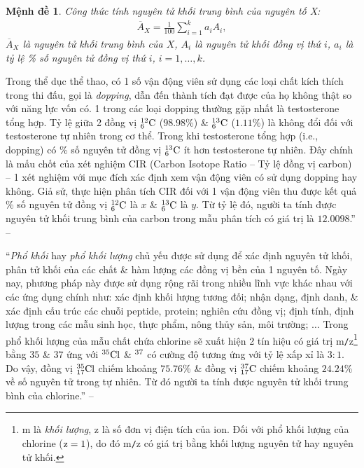 \documentclass{article}
\numberwithin{equation}{section}
\newtheorem{menhde}{Mệnh đề}[section]
\begin{document}
\begin{menhde}
	Công thức tính nguyên tử khối trung bình của nguyên tố X:
	\begin{align*}
		\overline{A}_X = \frac{1}{100}\sum_{i=1}^k a_iA_i,
	\end{align*}
	$\overline{A}_X$ là nguyên tử khối trung bình của $X$, $A_i$ là nguyên tử khối đồng vị thứ $i$, $a_i$ là tỷ lệ \% số nguyên tử đồng vị thứ $i$, $i = 1,\ldots,k$.
\end{menhde}
Trong thể dục thể thao, có 1 số vận động viên sử dụng các loại chất kích thích trong thi đấu, gọi là \textit{dopping}, dẫn đến thành tích đạt được của họ không thật so với năng lực vốn có. 1 trong các loại dopping thường gặp nhất là testosterone tổng hợp. Tỷ lệ giữa 2 đồng vị $\rm{}_6^{12}C$ ($98.98$\%) \& $\rm{}_6^{13}C$ ($1.11$\%) là không đổi đối với testosterone tự nhiên trong cơ thể. Trong khi testosterone tổng hợp (i.e., dopping) có \% số nguyên tử đồng vị $\rm{}_6^{13}C$ ít hơn testosterone tự nhiên. Đây chính là mấu chốt của xét nghiệm CIR (Carbon Isotope Ratio -- Tỷ lệ đồng vị carbon) -- 1 xét nghiệm với mục đích xác định xem vận động viên có sử dụng dopping hay không. Giả sử, thực hiện phân tích CIR đối với 1 vận động viên thu được kết quả \% số nguyên tử đồng vị $\rm{}_6^{12}C$ là $x$ \& $\rm{}_6^{13}C$ là $y$. Từ tỷ lệ đó, người ta tính được nguyên tử khối trung bình của carbon trong mẫu phân tích có giá trị là $12.0098$.'' -- \cite[p. 24]{SGK_Hoa_Hoc_10_Chan_Troi_Sang_Tao}

``\textit{Phổ khối} hay \textit{phổ khối lượng} chủ yếu được sử dụng để xác định nguyên tử khối, phân tử khối của các chất \& hàm lượng các đồng vị bền của 1 nguyên tố. Ngày nay, phương pháp này được sử dụng rộng rãi trong nhiều lĩnh vực khác nhau với các ứng dụng chính như: xác định khối lượng tương đối; nhận dạng, định danh, \& xác định cấu trúc các chuỗi peptide, protein; nghiên cứu đồng vị; định tính, định lượng trong các mẫu sinh học, thực phẩm, nông thủy sản, môi trường; $\ldots$ Trong phổ khối lượng của mẫu chất chứa chlorine sẽ xuất hiện 2 tín hiệu có giá trị m\texttt{/}z\footnote{m là \textit{khối lượng}, z là số đơn vị điện tích của ion. Đối với phổ khối lượng của chlorine ($\rm z = 1$), do đó m\texttt{/}z có giá trị bằng khối lượng nguyên tử hay nguyên tử khối.} bằng $35$ \& $37$ ứng với $\rm{}^{35}Cl$ \& $\rm{}^{37}$ có cường độ tương ứng với tỷ lệ xấp xỉ là $3:1$. Do vậy, đồng vị $\rm{}_{17}^{35}Cl$ chiếm khoảng $75.76$\% \& đồng vị $\rm{}_{17}^{37}C$ chiếm khoảng $24.24$\% về số nguyên tử trong tự nhiên. Từ đó người ta tính được nguyên tử khối trung bình của chlorine.'' -- \cite[p. 24]{SGK_Hoa_Hoc_10_Chan_Troi_Sang_Tao}
\end{document}
